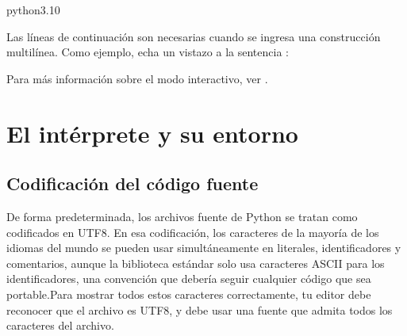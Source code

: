 \documentclass[a5paper,10pt,spanish]{sphinxmanual}
\begin{document}
\begin{sphinxVerbatim}[commandchars=\\\{\}]
 python3.10
\PYGZgt{}\PYGZgt{}
\end{sphinxVerbatim}

\sphinxAtStartPar
Las líneas de continuación son necesarias cuando se ingresa una construcción multilínea. Como ejemplo, echa un vistazo a la sentencia :

\begin{sphinxVerbatim}[commandchars=\\\{\}]
  
 
    
\end{sphinxVerbatim}

\sphinxAtStartPar
Para más información sobre el modo interactivo, ver {\hyperref[\detokenize{tutorial/appendix:tut-interac}]{}}.


\section{El intérprete y su entorno}
\label{\detokenize{tutorial/interpreter:the-interpreter-and-its-environment}}\label{\detokenize{tutorial/interpreter:tut-interp}}

\subsection{Codificación del código fuente}
\label{\detokenize{tutorial/interpreter:source-code-encoding}}\label{\detokenize{tutorial/interpreter:tut-source-encoding}}
\sphinxAtStartPar
De forma predeterminada, los archivos fuente de Python se tratan como codificados en UTF\sphinxhyphen{}8. En esa codificación, los caracteres de la mayoría de los idiomas del mundo se pueden usar simultáneamente en literales, identificadores y comentarios, aunque la biblioteca estándar solo usa caracteres ASCII para los identificadores, una convención que debería seguir cualquier código que sea portable.Para mostrar todos estos caracteres correctamente, tu editor debe reconocer que el archivo es UTF\sphinxhyphen{}8, y debe usar una fuente que admita todos los caracteres del archivo.
\end{document}
